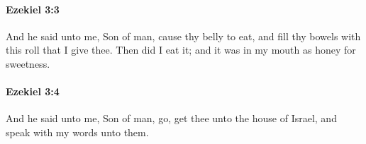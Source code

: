 		\paragraph{Ezekiel 3:3} %
			\label{EZEKIEL-3-3}

			And he said unto me, Son of man, cause thy belly to eat, and fill thy bowels with this roll that I give thee. Then did I eat it; and it was in my mouth as honey for sweetness.


		\paragraph{Ezekiel 3:4} %
			\label{EZEKIEL-3-4}

			And he said unto me, Son of man, go, get thee unto the house of Israel, and speak with my words unto them.


